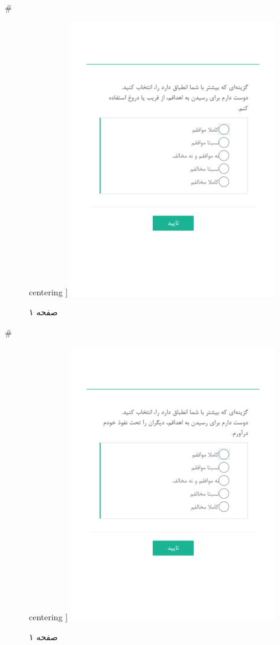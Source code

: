 { 
 # 
\begin{figure}[htpb]
centering ]
\includegraphics[width=0.8\textwidth]{./img/Task34.png/}
\caption{صفحه ۱}
\label{fig:Task1}
\end{figure}
 
 
 # 
\begin{figure}[htpb]
centering ]
\includegraphics[width=0.8\textwidth]{./img/Task35.png/}
\caption{صفحه ۱}
\label{fig:Task1}
\end{figure}
 
}

